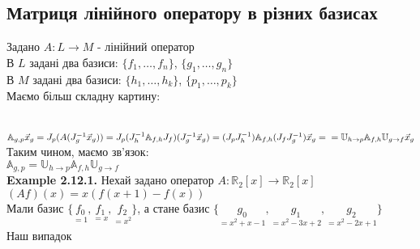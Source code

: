 \documentclass[a4paper, 14pt]{extarticle}
\def\bigline{\vspace{5mm}\\}
\begin{document}
\subsection{Матриця лінійного оператору в різних базисах}
Задано $A: L \to M$ - лінійний оператор\\
В $L$ задані два базиси: $\{f_1,\dots, f_n\}$, $\{g_1, \dots, g_n\}$\\
В $M$ задані два базиси: $\{h_1,\dots, h_k\}$, $\{p_1, \dots, p_k\}$\\
Маємо більш складну картину:\\
\\
$\mathbb{A}_{g,p} \vec{x}_g = J_p(A(J_g^{-1} \vec{x}_g)) = J_p(J_h^{-1} \mathbb{A}_{f,h} J_f)(J_g^{-1} \vec{x}_g) = (J_p J_h^{-1}) \mathbb{A}_{f,h} (J_f J_g^{-1})\vec{x}_g = \\
= \mathbb{U}_{h \to p} \mathbb{A}_{f,h} \mathbb{U}_{g \to f} \vec{x}_g$\\
Таким чином, маємо зв'язок:\\
$\mathbb{A}_{g,p} = \mathbb{U}_{h \to p} \mathbb{A}_{f,h} \mathbb{U}_{g \to f}$
\bigline
\textbf{Example 2.12.1.} Нехай задано оператор $A: \mathbb{R}_2[x] \to \mathbb{R}_2[x]$\\
$(Af)(x) = x(f(x+1)-f(x))$\\
Мали базис $\{\underset{=1}{f_0},\underset{=x}{f_1},\underset{=x^2}{f_2}\}$, а стане базис $\{\underset{=x^2+x-1}{g_0},\underset{=x^2-3x+2}{g_1},\underset{=x^2-2x+1}{g_2}\}$\\
Наш випадок\\
\end{document}

